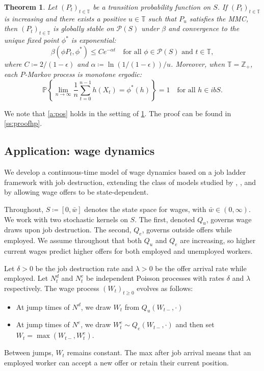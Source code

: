 \documentclass[12pt,reqno]{amsart}
\numberwithin{equation}{section}
\newtheorem{theorem}{Theorem}[section]
\theoremstyle{definition}
\newcommand{\1}{\mathbbm{1}}
\newcommand{\ZZ}{\mathbb{Z}}
\newcommand{\PP}{\mathbb P}
\newcommand{\TT}{\mathbb T}
\newcommand{\pP}{\mathscr{P}}
\begin{document}
\begin{theorem}\label{t:hp}
    Let $(P_t)_{t \in \TT}$ be a transition probability function on $S$.
    If $(P_t)_{t \in
    \TT}$ is increasing and there exists a positive $u \in \TT$ such that $P_u$
    satisfies the MMC, then $(P_t)_{t \in \TT}$ is globally stable on $\pP(S)$
    under $\beta$ and convergence to the unique fixed point $\phi^*$ is
    exponential: 
    \begin{equation}\label{eq:exp_conv}
        \beta(\phi P_t, \phi^*) \leq C e^{-\alpha t}
        \quad \text{for all $\phi \in \pP(S)$ and $t \in \TT$},
    \end{equation}
    where $C \coloneq 2/(1-\epsilon)$ and $\alpha \coloneq \ln(1/(1-\epsilon))/u$.
    Moreover, when $\TT = \ZZ_+$, each $P$-Markov process is monotone ergodic:
    \begin{equation*}
        \PP
        \left\{
             \lim_{n \to \infty}
             \frac{1}{n} \sum_{t=0}^{n-1} h(X_t) = \phi^*(h)
        \right\} = 1
        \quad \text{for all } h \in ibS.
    \end{equation*}
\end{theorem}


We note that \cref{a:pos} holds in the setting of \cref{t:hp}.
The proof can be found in \cref{ss:proofhp}.


\subsection{Application: wage dynamics}\label{ss:awd}

We develop a continuous-time model of wage dynamics based on a job ladder
framework with job destruction, extending the class of models studied by
\cite{burdett1998wage}, \cite{moscarini2013stochastic}, and
\cite{coles2016equilibrium} by allowing wage offers to be state-dependent.

Throughout, $S \coloneq [0, \bar{w}]$ denotes the
state space for wages, with $\bar{w} \in (0,\infty)$. We work with two stochastic
kernels on $S$.  The first, denoted $Q_u$, governs wage draws upon job destruction.
The second, $Q_e$, governs outside offers while employed.
We assume throughout that both $Q_u$ and $Q_e$ are increasing, so higher current
wages predict higher offers for both employed and unemployed workers.

Let $\delta > 0$ be the job destruction rate and $\lambda > 0$ be the offer
arrival rate while employed. Let $N^d_t$ and $N^e_t$ be independent Poisson
processes with rates $\delta$ and $\lambda$ respectively.
The wage process $(W_t)_{t \geq 0}$ evolves as follows:
%
\begin{itemize}[nosep]
    \item At jump times of $N^d$, we draw $W_t$ from $Q_u(W_{t-}, \cdot)$
    \item At jump times of $N^e$, we draw $W^e_t \sim Q_e(W_{t-}, \cdot)$ and
        then set $W_t = \max(W_{t-}, W^e_t)$.
\end{itemize}
%
Between jumps, $W_t$ remains constant.  The max after job arrival means that an
employed worker can accept a new offer or retain their current position.
\end{document}
